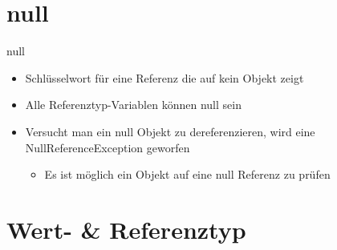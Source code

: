 \section{null}
\begin{frame}{null}
	\begin{itemize}
		\item Schlüsselwort für eine Referenz die auf kein Objekt zeigt
		\item Alle Referenztyp-Variablen können \alert{null} sein
		\item Versucht man ein \alert{null} Objekt zu dereferenzieren, wird eine NullReferenceException geworfen 
		\begin{itemize}
			\item Es ist möglich ein Objekt auf eine \alert{null} Referenz zu prüfen
		\end{itemize}
	\end{itemize}
		
\end{frame}

\section{Wert- \& Referenztyp}



